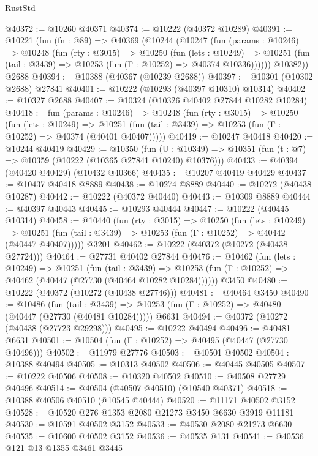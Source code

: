 \begin{lexlean}{RustStd}
\begin{coremodule}
@40372 := @10260 @40371
@40374 := @10222 (@40372 @10289)
@40391 := @10221
    (fun (fn : @89) =>
    @40369
      (@10244
        (@10247
          (fun (params : @10246) =>
          @10248
            (fun (rty : @3015) =>
            @10250
              (fun (lets : @10249) =>
              @10251 (fun (tail : @3439) => @10253 (fun (Γ : @10252) => @40374 @10336))))))
        @10382))
    @2688
@40394 := @10388 (@40367 (@10239 @2688))
@40397 := @10301 (@10302 @2688) @27841
@40401 := @10222 (@10293 (@40397 @10310) @10314)
@40402 := @10327 @2688
@40407 := @10324 (@10326 @40402 @27844 @10282 @10284)
@40418 := fun (params : @10246) =>
  @10248
    (fun (rty : @3015) =>
    @10250
      (fun (lets : @10249) =>
      @10251 (fun (tail : @3439) => @10253 (fun (Γ : @10252) => @40374 (@40401 @40407)))))
@40419 := @10247 @40418
@40420 := @10244 @40419
@40429 := @10350
    (fun (U : @10349) => @10351 (fun (t : @7) => @10359 (@10222 (@10365 @27841 @10240) @10376)))
@40433 := @40394 (@40420 @40429) (@10432 @40366)
@40435 := @10207 @40419 @40429
@40437 := @10437 @40418 @8889
@40438 := @10274 @8889
@40440 := @10272 (@40438 @10287)
@40442 := @10222 (@40372 @40440)
@40443 := @10309 @8889
@40444 := @40397 @40443
@40445 := @10293 @40444
@40447 := @10222 (@40445 @10314)
@40458 := @10440
    (fun (rty : @3015) =>
    @10250
      (fun (lets : @10249) =>
      @10251 (fun (tail : @3439) => @10253 (fun (Γ : @10252) => @40442 (@40447 @40407)))))
    @3201
@40462 := @10222 (@40372 (@10272 (@40438 @27724)))
@40464 := @27731 @40402 @27844
@40476 := @10462
    (fun (lets : @10249) =>
    @10251
      (fun (tail : @3439) =>
      @10253 (fun (Γ : @10252) => @40462 (@40447 (@27730 (@40464 @10282 @10284))))))
    @3450
@40480 := @10222 (@40372 (@10272 (@40438 @27746)))
@40481 := @40464 @3450
@40490 := @10486
    (fun (tail : @3439) => @10253 (fun (Γ : @10252) => @40480 (@40447 (@27730 (@40481 @10284)))))
    @6631
@40494 := @40372 (@10272 (@40438 (@27723 @29298)))
@40495 := @10222 @40494
@40496 := @40481 @6631
@40501 := @10504 (fun (Γ : @10252) => @40495 (@40447 (@27730 @40496)))
@40502 := @11979 @27776
@40503 := @40501 @40502
@40504 := @10388 @40494
@40505 := @10313 @40502
@40506 := @40445 @40505
@40507 := @10222 @40506
@40508 := @10320 @40502
@40510 := @40508 @27729 @40496
@40514 := @40504 (@40507 @40510) (@10540 @40371)
@40518 := @10388 @40506 @40510 (@10545 @40444)
@40520 := @11171 @40502 @3152
@40528 := @40520 @276 @1353 @2080 @21273 @3450 @6630 @3919 @11181
@40530 := @10591 @40502 @3152
@40533 := @40530 @2080 @21273 @6630
@40535 := @10600 @40502 @3152
@40536 := @40535 @131
@40541 := @40536 @121 @13 @1355 @3461 @3445

\end{coremodule}
\end{lexlean}
